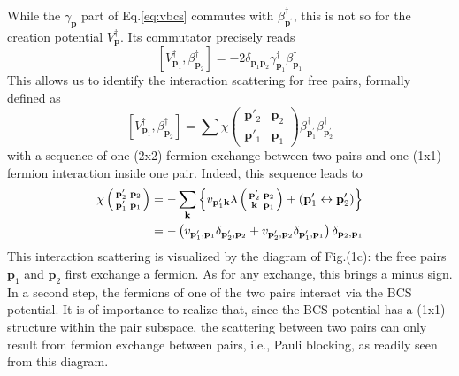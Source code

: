 \documentclass[aps,prb,superscriptaddress,showpacs,reprint,lengthcheck]{revtex4-1}
\newcommand{\vk}{\ensuremath{\mathbf{k}}}
\newcommand{\vp}{\ensuremath{\mathbf{p}}}
\begin{document}
While the $\gamma^{\dagger}_\vp$ part of Eq.\eqref{eq:vbcs} 
commutes with $%
\beta^{\dagger}_{\vp ^\prime}$, 
this is not so for the creation potential $%
V^{\dagger}_\vp$. Its commutator precisely reads 
\begin{equation}  \label{eq:vpotbeta}
\left[V^{\dagger}_{\mathbf{p} _1},\beta^{\dagger}_{\mathbf{p} _2}\right] 
=-2\delta_{\mathbf{p} _1\mathbf{p} _2}\gamma^{\dagger}_{\mathbf{p}
_1}\beta^{\dagger}_{\mathbf{p} _1}
\end{equation}
This allows us to identify the interaction scattering for free pairs,
formally defined as 
\begin{equation}  \label{eq:vBeta}
\left[V^{\dagger}_{\mathbf{p} _1},\beta^{\dagger}_{\mathbf{p} _2}\right] 
=\sum\chi\left(\begin{smallmatrix}\vp'_2&\vp_2\\\vp'_1&\vp_1\end{smallmatrix}%
\right)  \beta^{\dagger}_{\mathbf{p} ^{\prime}_1}\beta^{\dagger}_{\mathbf{p}
^{\prime}_2}
\end{equation}
with a sequence of one (2x2) fermion exchange between two pairs and one (1x1) fermion interaction inside one pair. Indeed, this sequence leads to
\begin{equation}  \label{eq:interactSc}
\begin{split}
\chi\left(\begin{smallmatrix}\vp'_2&\vp_2\\\vp'_1&\vp_1\end{smallmatrix}%
\right)  &=-\sum_\vk\left\{v_{\mathbf{p} ^{\prime}_1\mathbf{k} }\lambda\left(%
\begin{smallmatrix}\vp'_2&\vp_2\\\vk&\vp_1\end{smallmatrix}\right)  +\left(%
\mathbf{p} ^{\prime}_1\leftrightarrow\mathbf{p} ^{\prime}_2\right) \right\} 
\\
&=-\left(v_{\mathbf{p} ^{\prime}_1,\mathbf{p} _1}\delta_{\mathbf{p}
^{\prime}_2,\mathbf{p} _2}+v_{\mathbf{p} ^{\prime}_2,\mathbf{p} _2}\delta_{%
\mathbf{p} ^{\prime}_1,\mathbf{p} _1}\right) \delta_{\mathbf{p} _2,\mathbf{p}
_1}
\end{split}%
\end{equation}
This interaction scattering is visualized by the diagram of Fig.(1c): the free pairs $\mathbf{p}_1$ and $\mathbf{p}_2$ first
exchange a fermion. As for any exchange, this brings a minus sign. In a
second step, the fermions of one of the two pairs interact via the BCS
potential. It is of importance to realize that, since the BCS potential has a (1x1)
structure within the pair subspace, the scattering between two pairs can only result from
fermion exchange between pairs, i.e., Pauli blocking, as readily seen from this diagram.
\end{document}
